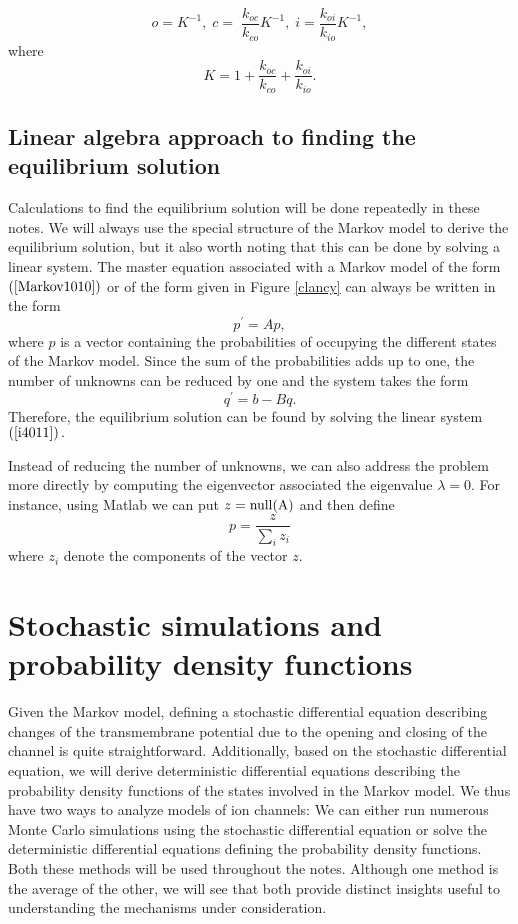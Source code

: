 \[
o=K^{-1},\;c=\;\frac{k_{oc}}{k_{co}}K^{-1},\;i=\frac{k_{oi}}{k_{io}}K^{-1},%
\]
where%
\[
K=1+\frac{k_{oc}}{k_{co}}+\frac{k_{oi}}{k_{io}}.
\]

\subsection[Linear algebra]{Linear algebra approach to finding the equilibrium solution}

Calculations to find the equilibrium solution will be done repeatedly in these notes. We
will always use the special structure of the Markov model to derive the
equilibrium solution, but it also worth noting that this can be done by
solving a linear system. The master equation associated with a Markov model of the
form  $\left(  \ref{Markov1010}\right)$ or of the form given in
Figure \ref{clancy} can always be written in the form%
\[
p^{\prime}=Ap,
\]
where $p$ is a vector containing the probabilities of occupying the different
states of the Markov model. Since the sum of the probabilities adds up to one,
the number of unknowns can be reduced by one and the system takes the form%
\[
q^{\prime}=b-Bq.
\]
Therefore, the equilibrium solution can be found by solving the linear system
$\left(  \ref{i4011}\right)  .$

Instead of reducing the number of unknowns, we can also address the problem more directly by computing the eigenvector
associated the eigenvalue $\lambda = 0$. For instance, using Matlab  we can put $z=\rm{null}(A)$ and then define 
\[p=\frac{z}{\sum_i z_i}\]
 where
$z_i$ denote the components of the vector $z$.


\section[Stochastic simulations and PDFs]{Stochastic simulations and probability density functions}

Given the Markov model, defining a stochastic differential equation describing changes of the transmembrane potential due to the opening and closing of the channel is quite straightforward. Additionally, based on the stochastic differential equation, we will derive deterministic differential equations describing the probability density functions of the states involved in the Markov model. We thus have two ways to analyze models of ion channels: We can either run numerous Monte Carlo simulations using the stochastic differential equation or solve the deterministic differential equations defining the probability density functions. Both these methods will be used throughout the notes. Although one method is the average of the other, we will see that both provide distinct insights useful to understanding the mechanisms under consideration. 


